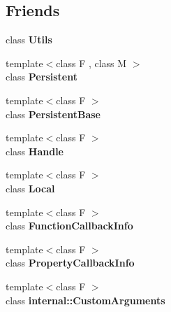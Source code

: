 \subsection*{Friends}
\begin{DoxyCompactItemize}
\item 
\hypertarget{classv8_1_1Handle_abc0f7da619e9e72510dc07ed7b5ff6d8}{}class {\bfseries Utils}\label{classv8_1_1Handle_abc0f7da619e9e72510dc07ed7b5ff6d8}

\item 
\hypertarget{classv8_1_1Handle_ad845ec8872174be0a9ca9a3dd1898d30}{}{\footnotesize template$<$class F , class M $>$ }\\class {\bfseries Persistent}\label{classv8_1_1Handle_ad845ec8872174be0a9ca9a3dd1898d30}

\item 
\hypertarget{classv8_1_1Handle_abb172e0bb22fc5fed7a3a66f29d046ce}{}{\footnotesize template$<$class F $>$ }\\class {\bfseries Persistent\+Base}\label{classv8_1_1Handle_abb172e0bb22fc5fed7a3a66f29d046ce}

\item 
\hypertarget{classv8_1_1Handle_a67ca1a2d91273eaf85fb3d23ba8ce984}{}{\footnotesize template$<$class F $>$ }\\class {\bfseries Handle}\label{classv8_1_1Handle_a67ca1a2d91273eaf85fb3d23ba8ce984}

\item 
\hypertarget{classv8_1_1Handle_afb872edb4aac7ba55f0da004113aa2b0}{}{\footnotesize template$<$class F $>$ }\\class {\bfseries Local}\label{classv8_1_1Handle_afb872edb4aac7ba55f0da004113aa2b0}

\item 
\hypertarget{classv8_1_1Handle_a76786e6fa2d0eac5e2d4f647659d0d23}{}{\footnotesize template$<$class F $>$ }\\class {\bfseries Function\+Callback\+Info}\label{classv8_1_1Handle_a76786e6fa2d0eac5e2d4f647659d0d23}

\item 
\hypertarget{classv8_1_1Handle_a5018adab21fade2b42f4f60e45fa1083}{}{\footnotesize template$<$class F $>$ }\\class {\bfseries Property\+Callback\+Info}\label{classv8_1_1Handle_a5018adab21fade2b42f4f60e45fa1083}

\item 
\hypertarget{classv8_1_1Handle_a07108678a2af25caab612879ed7dca62}{}{\footnotesize template$<$class F $>$ }\\class {\bfseries internal\+::\+Custom\+Arguments}\label{classv8_1_1Handle_a07108678a2af25caab612879ed7dca62}


\end{DoxyCompactItemize}
